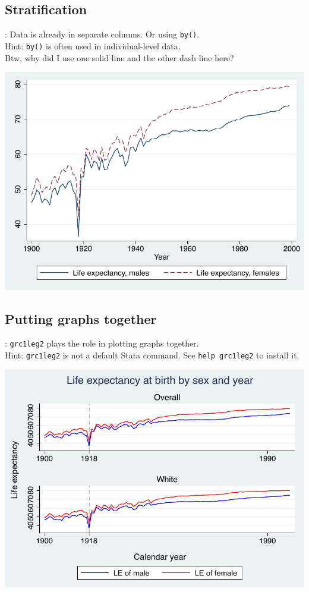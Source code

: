 \subsection{Stratification}
\begin{frame}[fragile]{\secname: \subsecname}
Data is already in separate columns. Or using \verb|by()|. \\
Hint: \verb|by()| is often used in individual-level data. \\
Btw, why did I use one solid line and the other dash line here?
\begin{center}
	\includegraphics[scale=0.5]{images/stratification}
\end{center}

\end{frame}
\subsection{Putting graphs together}
\begin{frame}[fragile]{\secname: \subsecname}
\verb|grc1leg2| plays the role in plotting graphs together. \\
Hint: \verb|grc1leg2| is not a default Stata command. See \verb|help grc1leg2| to install it.
\begin{center}
	\includegraphics[scale=0.5]{images/grc1leg2}
\end{center}
\end{frame}

